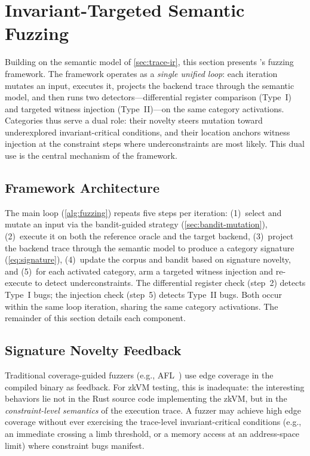 \section{Invariant-Targeted Semantic Fuzzing}\label{sec:fuzzing-framework}

Building on the semantic model of \autoref{sec:trace-ir}, this section presents \tool's fuzzing framework. The framework operates as a \emph{single unified loop}: each iteration mutates an input, executes it, projects the backend trace through the semantic model, and then runs two detectors---differential register comparison (Type~I) and targeted witness injection (Type~II)---on the same category activations. Categories thus serve a dual role: their novelty steers mutation toward underexplored invariant-critical conditions, and their location anchors witness injection at the constraint steps where underconstraints are most likely. This dual use is the central mechanism of the framework.

\subsection{Framework Architecture}\label{sec:framework-arch}

The main loop (\autoref{alg:fuzzing}) repeats five steps per iteration: (1)~select and mutate an input via the bandit-guided strategy (\autoref{sec:bandit-mutation}), (2)~execute it on both the reference oracle and the target backend, (3)~project the backend trace through the semantic model to produce a category signature (\autoref{eq:signature}), (4)~update the corpus and bandit based on signature novelty, and (5)~for each activated category, arm a targeted witness injection and re-execute to detect underconstraints. The differential register check (step~2) detects Type~I bugs; the injection check (step~5) detects Type~II bugs. Both occur within the same loop iteration, sharing the same category activations. The remainder of this section details each component.

\subsection{Signature Novelty Feedback}\label{sec:signature-feedback}

Traditional coverage-guided fuzzers (e.g., AFL~\cite{afl}) use edge coverage in the compiled binary as feedback. For zkVM testing, this is inadequate: the interesting behaviors lie not in the Rust source code implementing the zkVM, but in the \emph{constraint-level semantics} of the execution trace. A fuzzer may achieve high edge coverage without ever exercising the trace-level invariant-critical conditions (e.g., an immediate crossing a limb threshold, or a memory access at an address-space limit) where constraint bugs manifest.

